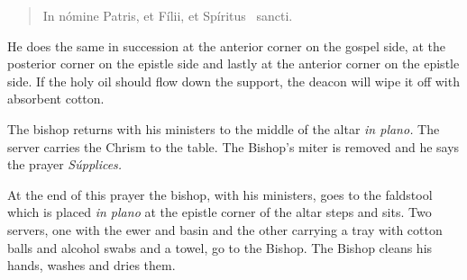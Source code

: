 \documentclass[letterpaper]{report}
\begin{document}
{    \begin{quote}
        In nómine Pa\cross tris, et Fí\cross lii, et Spíritus \cross\ sancti.
    \end{quote}

    He does the same in succession at the anterior corner on the gospel side, at
    the posterior corner on the epistle side and lastly at the anterior corner on
    the epistle side. If the holy oil should flow down the support, the deacon will
    wipe it off with absorbent cotton.

    \rubric The bishop returns with his ministers to the middle of the altar
    \textit{in plano.} The server carries the Chrism to the table. The Bishop's
    miter is removed and he says the prayer \textit{Súpplices.}

    \rubric At the end of this prayer the bishop, with his ministers, goes to the
    faldstool which is placed \textit{in plano} at the epistle corner of the altar
    steps and sits. Two servers, one with the ewer and basin and the other carrying
    a tray with cotton balls and alcohol swabs and a towel, go to the Bishop. The
    Bishop cleans his hands, washes and dries them.

}
\end{document}
